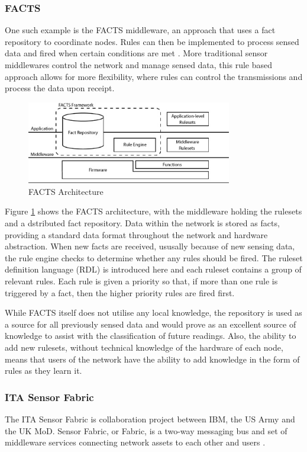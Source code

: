 	\subsubsection{FACTS}
		One such example is the FACTS middleware, an approach that uses a fact repository to coordinate nodes. Rules can then be implemented to process sensed data and fired when certain conditions are met \cite{Terfloth2006}. More traditional sensor middlewares control the network and manage sensed data, this rule based approach allows for more flexibility, where rules can control the transmissions and process the data upon receipt.

		\begin{figure}[p]
		\centering
		\includegraphics[width=0.8\textwidth]{Chap2/figures/facts_architecture}
		\caption{FACTS Architecture}
		\label{bg:fig:facts}
		\end{figure}

		Figure \ref{bg:fig:facts} shows the FACTS architecture, with the middleware holding the rulesets and a dstributed fact repository. Data within the network is stored as facts, providing a standard data format throughout the network and hardware abstraction. When new facts are received, ususally because of new sensing data, the rule engine checks to determine whether any rules should be fired. The ruleset definition language (RDL) is introduced here and each ruleset contains a group of relevant rules. Each rule is given a priority so that, if more than one rule is triggered by a fact, then the higher priority rules are fired first.

		While FACTS itself does not utilise any local knowledge, the repository is used as a source for all previously sensed data and would prove as an excellent source of knowledge to assist with the classification of future readings. Also, the ability to add new rulesets, without technical knowledge of the hardware of each node, means that users of the network have the ability to add knowledge in the form of rules as they learn it.
	
	\subsubsection{ITA Sensor Fabric}
	The ITA Sensor Fabric is collaboration project between IBM, the US Army and the UK MoD. Sensor Fabric, or Fabric, is a two-way messaging bus and set of middleware services connecting network assets to each other and users \cite{Wright2009b}.

